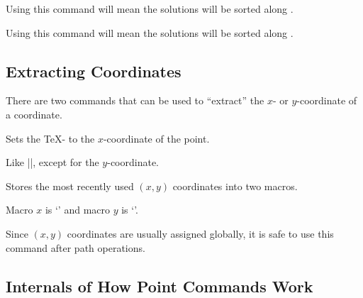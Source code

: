 \begin{command}{\pgfintersectionofpaths{}}
\let\ifpgfintersectionsortbyfirstpath=\relax
  \begin{command}{\pgfintersectionsortbyfirstpath}
    Using this command will mean the solutions will be sorted along
    .
  \end{command}

\let\ifpgfintersectionsortbysecondpath=\relax
  \begin{command}{\pgfintersectionsortbysecondpath}
    Using this command will mean the solutions will be sorted along
    .
  \end{command}

\end{command}




\subsection{Extracting Coordinates}

There are two commands that can be used to ``extract'' the $x$- or
$y$-coordinate of a coordinate.

\begin{command}{\pgfextractx{}}
  Sets the \TeX- to the $x$-coordinate of the point.

\begin{codeexample}
\newdimen\mydim
\pgfextractx{\mydim}{\pgfpoint{2cm}{4pt}}
\end{codeexample}
\end{command}

\begin{command}{\pgfextracty{}}
  Like |\pgfextractx|, except for the $y$-coordinate.
\end{command}

\begin{command}{\pgfgetlastxy{}}
	Stores the most recently used $(x,y)$ coordinates into two macros.
\begin{codeexample}[]
\pgfpoint{2cm}{4cm}
\pgfgetlastxy{\macrox}{\macroy}
Macro $x$ is `\macrox' and macro $y$ is `\macroy'.
\end{codeexample}
	Since $(x,y)$ coordinates are usually assigned globally, it is safe to use this command after path operations.
\end{command}



\subsection{Internals of How Point Commands Work}

